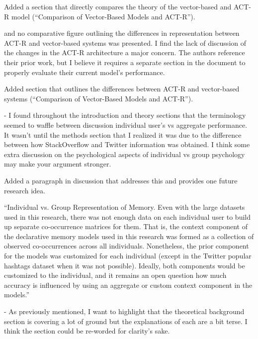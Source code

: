 \documentclass[answers,12pt]{exam}
\begin{document}
\begin{questions}
\begin{solution}
Added a section that directly compares the theory of the vector-based and ACT-R model (``Comparison of Vector-Based Models and ACT-R'').
\end{solution}

\question and no comparative figure outlining the differences in representation between ACT-R and vector-based systems was presented. I find the lack of discussion of the changes in the ACT-R architecture a major concern. The authors reference their prior work, but I believe it requires a separate section in the document to properly evaluate their current model's performance. 

\begin{solution}
Added section that outlines the differences between ACT-R and vector-based systems (``Comparison of Vector-Based Models and ACT-R'').
\end{solution}

\question - I found throughout the introduction and theory sections that the terminology seemed to waffle between discussion individual user's vs aggregate performance. It wasn't until the methods section that I realized it was due to the difference between how StackOverflow and Twitter information was obtained. I think some extra discussion on the psychological aspects of individual vs group psychology may make your argument stronger. 

\begin{solution}
 Added a paragraph in discussion that addresses this and provides one future research idea.

 ``Individual vs. Group Representation of Memory. Even with the large datasets used in this research, there was not enough data on each individual user to build up separate co-occurrence matrices for them. That is, the context component of the declarative memory models used in this research was formed as a collection of observed co-occurrences across all individuals. Nonetheless, the prior component for the models was customized for each individual (except in the Twitter popular hashtags dataset when it was
not possible). Ideally, both components would be customized to the individual, and it remains an open question how much accuracy is influenced by using an aggregate or custom context component in the models.''
\end{solution}

\question - As previously mentioned, I want to highlight that the theoretical background section is covering a lot of ground but the explanations of each are a bit terse. I think the section could be re-worded for clarity's sake.


\end{questions}
\end{document}

